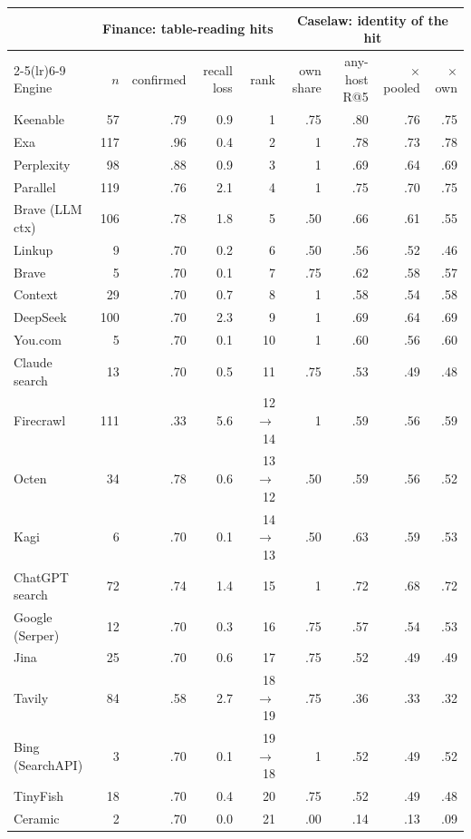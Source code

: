 \begin{tabular}{@{}lrrrrrrrr@{}}
\toprule
 & \multicolumn{4}{c}{Finance: table-reading hits} & \multicolumn{4}{c}{Caselaw: identity of the hit} \\
\cmidrule(lr){2-5}\cmidrule(lr){6-9}
Engine & $n$ & confirmed & recall loss & rank & own share & any-host R@5 & $\times$ pooled & $\times$ own \\
\midrule
Keenable & 57 & .79 & 0.9 & 1 & .75 & .80 & .76 & .75 \\
Exa & 117 & .96 & 0.4 & 2 & 1 & .78 & .73 & .78 \\
Perplexity & 98 & .88 & 0.9 & 3 & 1 & .69 & .64 & .69 \\
Parallel & 119 & .76 & 2.1 & 4 & 1 & .75 & .70 & .75 \\
Brave (LLM ctx) & 106 & .78 & 1.8 & 5 & .50 & .66 & .61 & .55 \\
Linkup & 9 & .70 & 0.2 & 6 & .50 & .56 & .52 & .46 \\
Brave & 5 & .70 & 0.1 & 7 & .75 & .62 & .58 & .57 \\
Context & 29 & .70 & 0.7 & 8 & 1 & .58 & .54 & .58 \\
DeepSeek & 100 & .70 & 2.3 & 9 & 1 & .69 & .64 & .69 \\
You.com & 5 & .70 & 0.1 & 10 & 1 & .60 & .56 & .60 \\
Claude search & 13 & .70 & 0.5 & 11 & .75 & .53 & .49 & .48 \\
Firecrawl & 111 & .33 & 5.6 & 12 $\to$ 14 & 1 & .59 & .56 & .59 \\
Octen & 34 & .78 & 0.6 & 13 $\to$ 12 & .50 & .59 & .56 & .52 \\
Kagi & 6 & .70 & 0.1 & 14 $\to$ 13 & .50 & .63 & .59 & .53 \\
ChatGPT search & 72 & .74 & 1.4 & 15 & 1 & .72 & .68 & .72 \\
Google (Serper) & 12 & .70 & 0.3 & 16 & .75 & .57 & .54 & .53 \\
Jina & 25 & .70 & 0.6 & 17 & .75 & .52 & .49 & .49 \\
Tavily & 84 & .58 & 2.7 & 18 $\to$ 19 & .75 & .36 & .33 & .32 \\
Bing (SearchAPI) & 3 & .70 & 0.1 & 19 $\to$ 18 & 1 & .52 & .49 & .52 \\
TinyFish & 18 & .70 & 0.4 & 20 & .75 & .52 & .49 & .48 \\
Ceramic & 2 & .70 & 0.0 & 21 & .00 & .14 & .13 & .09 \\
\bottomrule
\end{tabular}
